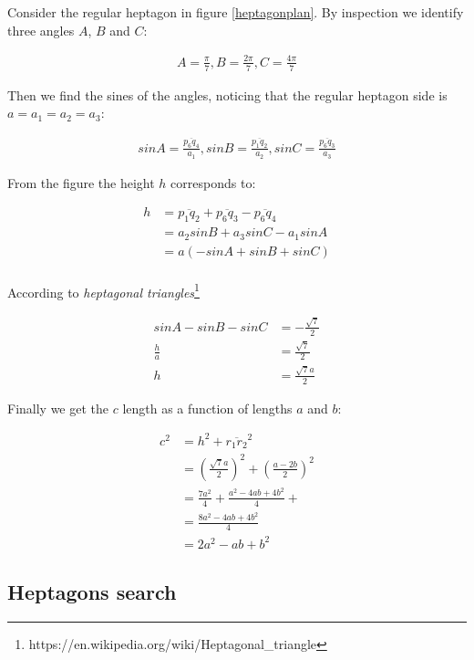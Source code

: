 \documentclass[11pt]{article}
\begin{document}
Consider the regular heptagon in figure \ref{heptagonplan}.
By inspection we identify three angles $A$, $B$ and $C$:

\begin{align*}
A = \frac{\pi}{7},
B = \frac{2\pi}{7},
C = \frac{4\pi}{7}
\end{align*}

Then we find the sines of the angles, noticing that the regular heptagon side is $a = a_1 = a_2 = a_3$:

\begin{align*}
sinA = \frac{\overline{p_6 q_4}}{a_1},
sinB = \frac{\overline{p_1 q_2}}{a_2},
sinC = \frac{\overline{p_6 q_3}}{a_3}
\end{align*}

From the figure the height $h$ corresponds to:

\begin{align*}
h &= \overline{p_1 q_2} + \overline{p_6 q_3} - \overline{p_6 q_4} \\
  &= a_2sinB + a_3sinC - a_1sinA \\
  &= a(-sinA + sinB + sinC)\\
\end{align*}

According to \emph{heptagonal triangles}\footnote{https://en.wikipedia.org/wiki/Heptagonal\_triangle}

\begin{align*}
sinA - sinB - sinC &= -\frac{\sqrt{7}}{2} \\
       \frac{h}{a} &= \frac{\sqrt{7}}{2} \\
                 h &= \frac{\sqrt{7}a}{2}
\end{align*}


Finally we get the $c$ length as a function of lengths $a$ and $b$:

\begin{align*}
c^2 &= h^2 + \overline{r_1 r_2}^2 \\
    &= (\frac{\sqrt{7}a}{2})^2 + (\frac{a - 2b}{2})^2 \\
    &= \frac{7a^2}{4} + \frac{a^2 - 4ab + 4b^2}{4} +  \\
    &= \frac{8a^2 - 4ab + 4b^2}{4}\\
    &= 2a^2 - ab + b^2
\end{align*}

\subsection{Heptagons search}
\end{document}

